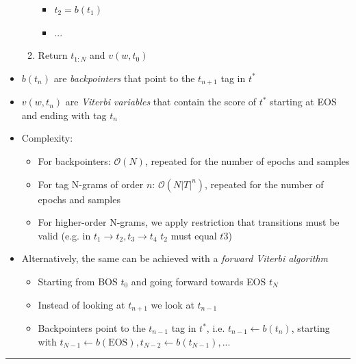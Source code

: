 \begin{itemize}
\begin{enumerate}
\begin{itemize}
            \item $t_2 = b(t_1)$
            \item $...$
        \end{itemize}
        \item Return $t_{1:N}$ and $v(w, t_0)$
    \end{enumerate}
    \item $b(t_n)$ are \emph{backpointers} that point to the $t_{n+1}$ tag in $t^*$
    \item $v(w, t_n)$ are \emph{Viterbi variables} that contain the score of $t^*$ starting at EOS and ending with tag $t_n$ 
    \item Complexity:
    \begin{itemize}
        \item For backpointers: $\mathcal{O}(N)$, repeated for the number of epochs and samples
        \item For tag N-grams of order $n$: $\mathcal{O}(N |T|^n)$, repeated for the number of epochs and samples
        \item For higher-order N-grams, we apply restriction that transitions must be valid (e.g. in $t_1 \to t_2, t_3 \to t_4$ $t_2$ must equal $t3$)
    \end{itemize}
    \item Alternatively, the same can be achieved with a \emph{forward Viterbi algorithm}
    \begin{itemize}
        \item Starting from BOS $t_0$ and going forward towards EOS $t_N$
        \item Instead of looking at $t_{n+1}$ we look at $t_{n-1}$
        \item Backpointers point to the $t_{n-1}$ tag in $t^*$, i.e. $t_{n-1} \gets b(t_n)$, starting with $t_{N-1} \gets b(\textrm{EOS}), t_{N-2} \gets b(t_{N-1}),...$
    \end{itemize}
\end{itemize}

{\color{lightgray}\hrule height 0.001mm}

